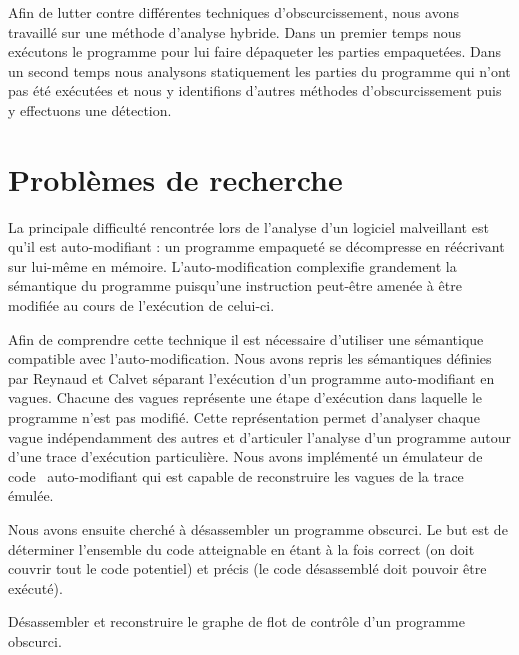 Afin de lutter contre différentes techniques d'obscurcissement, nous avons travaillé sur une méthode d'analyse hybride.
Dans un premier temps nous exécutons le programme pour lui faire dépaqueter les parties empaquetées. Dans un second temps nous analysons statiquement les parties du programme qui n'ont pas été exécutées et nous y identifions d'autres méthodes d'obscurcissement puis y effectuons une détection.

\section*{Problèmes de recherche}
La principale difficulté rencontrée lors de l'analyse d'un logiciel malveillant est qu'il est auto-modifiant : un programme empaqueté se décompresse en réécrivant sur lui-même en mémoire. L'auto-modification complexifie grandement la sémantique du programme puisqu'une instruction peut-être amenée à être modifiée au cours de l'exécution de celui-ci.


Afin de comprendre cette technique il est nécessaire d'utiliser une sémantique compatible avec l'auto-modification.
Nous avons repris les sémantiques définies par Reynaud \cite{Reynaud2010} et Calvet \cite{Calvet2013} séparant l'exécution d'un programme auto-modifiant en vagues. Chacune des vagues représente une étape d'exécution dans laquelle le programme n'est pas modifié. Cette représentation permet d'analyser chaque vague indépendamment des autres et d'articuler l'analyse d'un programme autour d'une trace d'exécution particulière.
Nous avons implémenté un émulateur de code \xq\ auto-modifiant qui est capable de reconstruire les vagues de la trace émulée.


Nous avons ensuite cherché à désassembler un programme obscurci. Le but est de déterminer l'ensemble du code atteignable en étant à la fois correct (on doit couvrir tout le code potentiel) et précis (le code désassemblé doit pouvoir être exécuté). 

\begin{pbb}
 Désassembler et reconstruire le graphe de flot de contrôle d'un programme obscurci.
\end{pbb}

